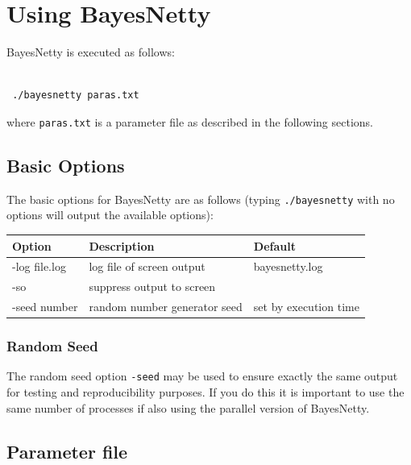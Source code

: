 \documentclass[a4paper,12pt]{article}
\newcommand{\code}[1]{{\footnotesize{{\tt #1}}}}
\begin{document}
\section{Using BayesNetty}
\label{using}

BayesNetty is executed as follows: 
\vspace{0.35cm} \begin{lstlisting}

 ./bayesnetty paras.txt

\end{lstlisting} \vspace{0.35cm}
where \code{paras.txt} is a parameter file as described in the following sections. 
\subsection{Basic Options}
\label{basic-options}

The basic options for BayesNetty are as follows (typing \code{./bayesnetty} with no options will output the available options): 

{\begin{center}\begin{tabular}{lll}
Option  & Description  & Default\\
\hline
-log file.log  & log file of screen output  & bayesnetty.log\\
-so  & suppress output to screen  & \\
-seed number  & random number generator seed  & set by execution time\\
\end{tabular}\end{center}}
\subsubsection{Random Seed}
\label{random-seed}
The random seed option \code{-seed} may be used to ensure exactly the same output for testing and reproducibility purposes. If you do this it is important to use the same number of processes if also using the parallel version of BayesNetty.



\subsection{Parameter file}
\label{parameterfile}
\end{document}
